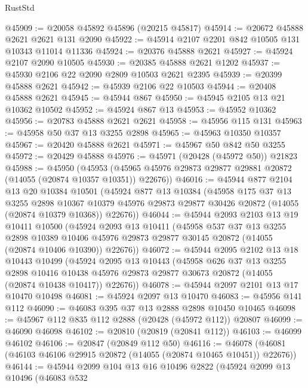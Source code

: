 \begin{lexlean}{RustStd}
\begin{coremodule}
@45909 := @20058 @45892 @45896 (@20215 @45817)
@45914 := @20672 @45888 @2621 @2621 @131 @2090
@45922 := @45914 @2107 @2201 @842 @10505 @131 @10343 @11014 @11336
@45924 := @20376 @45888 @2621
@45927 := @45924 @2107 @2090 @10505
@45930 := @20385 @45888 @2621 @1202
@45937 := @45930 @2106 @22 @2090 @2809 @10503 @2621 @2395
@45939 := @20399 @45888 @2621
@45942 := @45939 @2106 @22 @10503
@45944 := @20408 @45888 @2621
@45945 := @45944 @867
@45950 := @45945 @2105 @13 @21 @10362 @10502
@45952 := @45924 @867 @13
@45953 := @45952 @10362
@45956 := @20783 @45888 @2621 @2621
@45958 := @45956 @115 @131
@45963 := @45958 @50 @37 @13 @3255 @2898
@45965 := @45963 @10350 @10357
@45967 := @20420 @45888 @2621
@45971 := @45967 @50 @842 @50 @3255
@45972 := @20429 @45888
@45976 := @45971 (@20428 (@45972 @50)) @21823
@45988 := @45950
    (@45953 (@45965 @45976 @29873 @29877 @29881 @20872 (@14055 (@20874 @10357 @10351)) @22676))
@46016 := @45944
    @877
    @2104
    @13
    @20
    @10384
    @10501
    (@45924
      @877
      @13
      @10384
      (@45958
        @175
        @37
        @13
        @3255
        @2898
        @10367
        @10379
        @45976
        @29873
        @29877
        @30426
        @20872
        (@14055 (@20874 @10379 @10368))
        @22676))
@46044 := @45944
    @2093
    @2103
    @13
    @19
    @10411
    @10500
    (@45924
      @2093
      @13
      @10411
      (@45958
        @537
        @37
        @13
        @3255
        @2898
        @10389
        @10406
        @45976
        @29873
        @29877
        @30145
        @20872
        (@14055 (@20874 @10406 @10390))
        @22676))
@46072 := @45944
    @2095
    @2102
    @13
    @18
    @10443
    @10499
    (@45924
      @2095
      @13
      @10443
      (@45958
        @626
        @37
        @13
        @3255
        @2898
        @10416
        @10438
        @45976
        @29873
        @29877
        @30673
        @20872
        (@14055 (@20874 @10438 @10417))
        @22676))
@46078 := @45944 @2097 @2101 @13 @17 @10470 @10498
@46081 := @45924 @2097 @13 @10470
@46083 := @45956 @141 @112
@46090 := @46083 @395 @37 @13 @2888 @2898 @10450 @10465
@46098 := @45967 @112 @835 @112 @2888 (@20428 (@45972 @112)) @20807
@46099 := @46090 @46098
@46102 := @20810 (@20819 (@20841 @112))
@46103 := @46099 @46102
@46106 := @20847 (@20849 @112 @50)
@46116 := @46078 (@46081 (@46103 @46106 @29915 @20872 (@14055 (@20874 @10465 @10451)) @22676))
@46144 := @45944
    @2099
    @104
    @13
    @16
    @10496
    @2822
    (@45924
      @2099
      @13
      @10496
      (@46083
        @532

\end{coremodule}
\end{lexlean}
